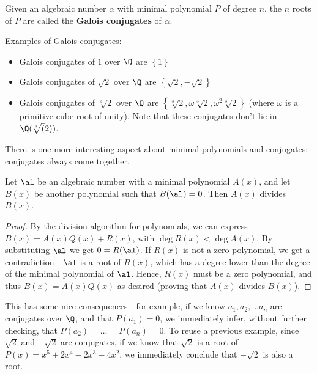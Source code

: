 \begin{df}
    Given an algebraic number $\alpha$ with minimal polynomial $P$ of degree $n$, the $n$ roots of $P$ are called the \textbf{Galois conjugates} of $\alpha$.
\end{df}

\begin{ex} Examples of Galois conjugates:
    \begin{itemize}
        \item Galois conjugates of $1$ over $\Q$ are $\left\{1\right\}$
        \item Galois conjugates of $\sqrt{2}$ over $\Q$ are $\left\{\sqrt{2}, -\sqrt{2}\right\}$
        \item Galois conjugates of $\sqrt[3]{2}$ over $\Q$ are $\left\{\sqrt[3]{2}, \omega\sqrt[3]{2}, \omega^2\sqrt[3]{2}\right\}$ (where $\omega$ is a primitive cube root of unity). Note that these conjugates don't lie in $\Q(\sqrt[3](2))$.
    \end{itemize}
\end{ex}

There is one more interesting aspect about minimal polynomials and conjugates: conjugates always come together.

\begin{thm}
    Let $\al$ be an algebraic number with a minimal polynomial $A(x)$, and let $B(x)$ be another polynomial such that $B(\al) = 0$. Then $A(x)$ divides $B(x)$.
\end{thm}
\begin{proof}
    By the division algorithm for polynomials, we can express $B(x) = A(x)Q(x) + R(x)$, with $\deg R(x) < \deg A(x)$. By substituting $\al$ we get $0 = R(\al)$.
    If $R(x)$ is not a zero polynomial, we get a contradiction - $\al$ is a root of $R(x)$, which has a degree lower than the degree of the minimal polynomial of $\al$.
    Hence, $R(x)$ must be a zero polynomial, and thus $B(x) = A(x)Q(x)$ as desired (proving that $A(x)$ divides $B(x)$).
\end{proof}

This has some nice consequences - for example, if we know $a_1, a_2, \ldots a_n$ are conjugates over $\Q$, and that $P(a_1) = 0$, we immediately infer, without further checking, that $P(a_2) = \ldots = P(a_n) = 0$.
To reuse a previous example, since $\sqrt{2}$ and $-\sqrt{2}$ are conjugates, if we know that $\sqrt{2}$ is a root of $P(x) = x^5 + 2x^4 - 2x^3 - 4x^2$, we immediately conclude that $-\sqrt{2}$ is also a root.


